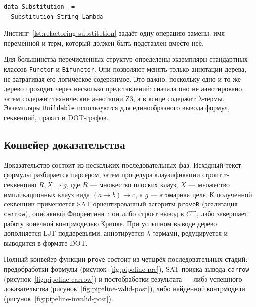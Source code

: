 \documentclass[14pt, russian]{scrartcl}
\begin{document}
\begin{listing}[!htb]
\caption{Подстановка \texttt{Substitution\_}}
\label{lst:refactoring-substitution}
\begin{verbatim}
data Substitution_ =
  Substitution String Lambda_
\end{verbatim}
\end{listing}

Листинг~\ref{lst:refactoring-substitution} задаёт одну операцию замены: имя
переменной и терм, который должен быть подставлен вместо неё.

Для большинства перечисленных структур определены экземпляры стандартных
классов \texttt{Functor} и \texttt{Bifunctor}. Они позволяют менять только
аннотации дерева, не затрагивая его логическое содержимое. Это важно, поскольку
одно и то же дерево проходит через несколько представлений: сначала оно не
аннотировано, затем содержит технические аннотации Z3, а в конце содержит
$\lambda$-термы. Экземпляры \texttt{Buildable} используются для единообразного
вывода формул, секвенций, правил и DOT-графов.

\subsection{Конвейер доказательства}

Доказательство состоит из нескольких последовательных фаз. Исходный текст
формулы разбирается парсером, затем процедура клаузификации строит r-секвенцию
$R, X \Rightarrow g$, где $R$ --- множество плоских клауз, $X$ --- множество
импликационных клауз вида $(a \rightarrow b) \rightarrow c$, а $g$ --- атомарная
цель. К полученной секвенции применяется SAT-ориентированный алгоритм
\texttt{proveR} (реализация \texttt{carrow}), описанный
Фиорентини~\cite{Fiorentini2021}: он либо строит вывод в $C^{\rightarrow}$, либо
завершает работу конечной контрмоделью Крипке. При успешном выводе дерево
дополняется LJT-поддеревьями, аннотируется $\lambda$-термами, редуцируется и
выводится в формате DOT.

Полный конвейер функции \texttt{prove} состоит из четырёх последовательных
стадий: предобработки формулы (рисунок~\ref{fig:pipeline-pre}), SAT-поиска
вывода \texttt{carrow} (рисунок~\ref{fig:pipeline-carrow}) и постобработки
результата --- либо успешного доказательства
(рисунок~\ref{fig:pipeline-valid-post}), либо найденной контрмодели
(рисунок~\ref{fig:pipeline-invalid-post}).
\end{document}
